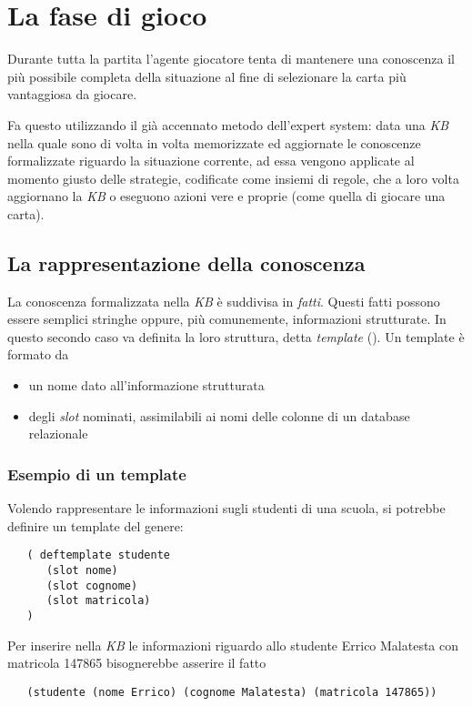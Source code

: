 \section{La fase di gioco}



Durante tutta la partita l'agente giocatore tenta di mantenere una conoscenza il più possibile completa della situazione al fine di selezionare la carta più vantaggiosa da giocare.

Fa questo utilizzando il già accennato metodo dell'expert system: data una \emph{KB} nella quale sono di volta in volta memorizzate ed aggiornate le conoscenze formalizzate riguardo la situazione corrente, ad essa vengono applicate al momento giusto delle strategie, codificate come insiemi di regole, che a loro volta aggiornano la \emph{KB} o eseguono azioni vere e proprie (come quella di giocare una carta).



\subsection{La rappresentazione della conoscenza}

La conoscenza formalizzata nella \emph{KB} è suddivisa in \emph{fatti}.
Questi fatti possono essere semplici stringhe oppure, più comunemente, informazioni strutturate.
In questo secondo caso va definita la loro struttura, detta \emph{template} (\cite{jessbook}).
Un template è formato da
\begin{itemize}
   \item un nome dato all'informazione strutturata
   \item degli \emph{slot} nominati, assimilabili ai nomi delle colonne di un database relazionale
\end{itemize}


\subsubsection*{Esempio di un template}
Volendo rappresentare le informazioni sugli studenti di una scuola, si potrebbe definire un template del genere:
\begin{verbatim}
   ( deftemplate studente 
      (slot nome)
      (slot cognome)
      (slot matricola)
   )
\end{verbatim}

Per inserire nella \emph{KB} le informazioni riguardo allo studente Errico Malatesta con matricola 147865 bisognerebbe asserire il fatto
\begin{verbatim}
   (studente (nome Errico) (cognome Malatesta) (matricola 147865))
\end{verbatim}



